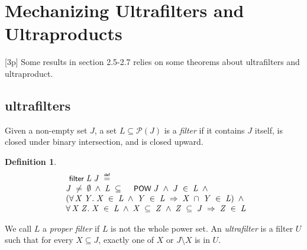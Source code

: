 \documentclass{llncs}
\newtheorem{defn}{Definition}[chapter]
\newenvironment{holmath}{\begin{displaymath}\begin{array}{l}}{\end{array}\end{displaymath}\ignorespacesafterend}
\renewcommand{\HOLConst}[1]{{\textsf{\upshape\small #1}}}
\begin{document}
\section{Mechanizing Ultrafilters and Ultraproducts}[3p]
Some results in section 2.5-2.7 relies on some theorems about ultrafilters and ultraproduct. 
\subsection{ultrafilters}
Given a non-empty set $J$, a set $L\subseteq {\mathcal P}(J)$   is a \emph{filter} if it contains $J$ itself, is closed under binary intersection, and is closed upward. 
\begin{defn}
{\upshape\cite[Definition A.12 (Filters)]{Blackburn}}
\begin{holmath}
  \HOLConst{filter}\;\HOLFreeVar{L}\;\HOLFreeVar{J}\;\HOLTokenDefEquality{}\\
\;\;\HOLFreeVar{J}\;\HOLSymConst{\HOLTokenNotEqual{}}\;\HOLSymConst{\HOLTokenEmpty{}}\;\HOLSymConst{\HOLTokenConj{}}\;\HOLFreeVar{L}\;\HOLSymConst{\HOLTokenSubset{}}\;\HOLConst{POW}\;\HOLFreeVar{J}\;\HOLSymConst{\HOLTokenConj{}}\;\HOLFreeVar{J}\;\HOLSymConst{\HOLTokenIn{}}\;\HOLFreeVar{L}\;\HOLSymConst{\HOLTokenConj{}}\\
\;\;(\HOLSymConst{\HOLTokenForall{}}\HOLBoundVar{X}\;\HOLBoundVar{Y}.\;\HOLBoundVar{X}\;\HOLSymConst{\HOLTokenIn{}}\;\HOLFreeVar{L}\;\HOLSymConst{\HOLTokenConj{}}\;\HOLBoundVar{Y}\;\HOLSymConst{\HOLTokenIn{}}\;\HOLFreeVar{L}\;\HOLSymConst{\HOLTokenImp{}}\;\HOLBoundVar{X}\;\HOLSymConst{\HOLTokenInter{}}\;\HOLBoundVar{Y}\;\HOLSymConst{\HOLTokenIn{}}\;\HOLFreeVar{L})\;\HOLSymConst{\HOLTokenConj{}}\\
\;\;\HOLSymConst{\HOLTokenForall{}}\HOLBoundVar{X}\;\HOLBoundVar{Z}.\;\HOLBoundVar{X}\;\HOLSymConst{\HOLTokenIn{}}\;\HOLFreeVar{L}\;\HOLSymConst{\HOLTokenConj{}}\;\HOLBoundVar{X}\;\HOLSymConst{\HOLTokenSubset{}}\;\HOLBoundVar{Z}\;\HOLSymConst{\HOLTokenConj{}}\;\HOLBoundVar{Z}\;\HOLSymConst{\HOLTokenSubset{}}\;\HOLFreeVar{J}\;\HOLSymConst{\HOLTokenImp{}}\;\HOLBoundVar{Z}\;\HOLSymConst{\HOLTokenIn{}}\;\HOLFreeVar{L}
\end{holmath}
\end{defn}
We call $L$ a \emph{proper filter} if $L$ is not the whole power set. An \emph{ultrafilter} is a filter $U$ such that for every $X\subseteq J$, exactly one of $X$ or $J\setminus X$ is in $U$.
\end{document}
